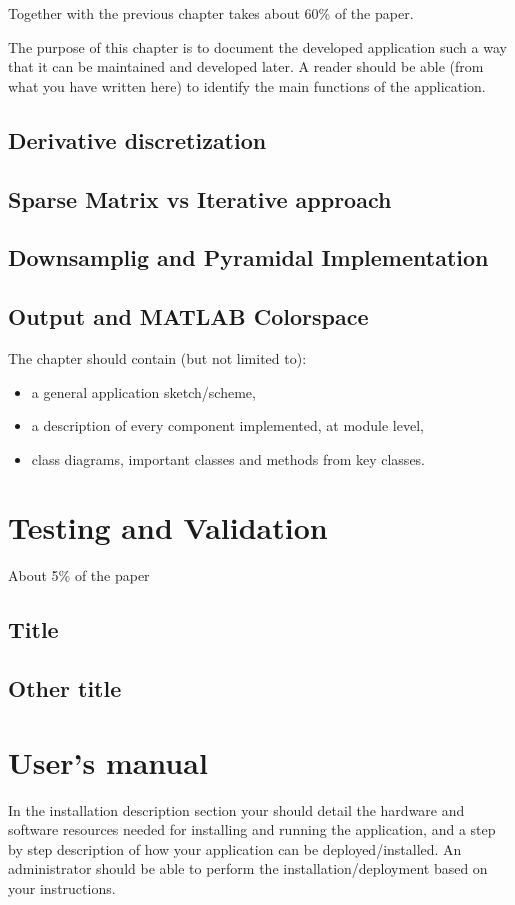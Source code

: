 \documentclass[12pt,a4paper,twoside]{report}
\begin{document}
Together with the previous chapter takes about 60\% of the paper.

The purpose of this chapter is to document the developed application such a way that it can be maintained and developed later. A reader should be able (from what you have written here) to identify the main functions of the application.
\section{Derivative discretization}
\section{Sparse Matrix vs Iterative approach}
\section{Downsamplig and Pyramidal Implementation}
\section{Output and MATLAB Colorspace}
The chapter should contain (but not limited to):
\begin{itemize}
 \item a general application sketch/scheme,
\item a description of every component implemented, at module level,
\item class diagrams, important classes and methods from key classes.

\end{itemize}

\chapter{Testing and Validation}

About 5\% of the paper
\section{Title}
\section{Other title}

\chapter{User's manual}

In the installation description section your should detail the hardware and software resources needed for installing and running the application, and a step by step description of how your application can be deployed/installed. An administrator should be able to perform the installation/deployment based on your instructions.
\end{document}
